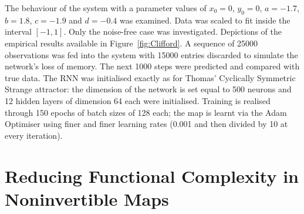 The behaviour of the system with a parameter values of $x_0=0$, $y_0=0$, $a = -1.7$,  $b = 1.8$, $c = -1.9$ and $d = -0.4$ was examined. 
Data was scaled to fit inside the interval $[-1,1]$. Only the noise-free case was investigated. Depictions of the empirical results available in Figure~\ref{fig:Clifford}.
 A sequence of 25000 observations was fed into the system with 15000 entries discarded to simulate the network's loss of memory. The next 1000 steps were predicted and compared with true data.
The RNN was initialised exactly as for Thomas' Cyclically Symmetric Strange attractor: the dimension of the network is set equal to 500 neurons and 12 hidden layers of dimension 64 each were initialised. Training is realised through 150 epochs of batch sizes of 128 each; the map is learnt via the Adam Optimiser using finer and finer learning rates (0.001 and then divided by 10 at every iteration).

\section{Reducing Functional Complexity in Noninvertible Maps}



